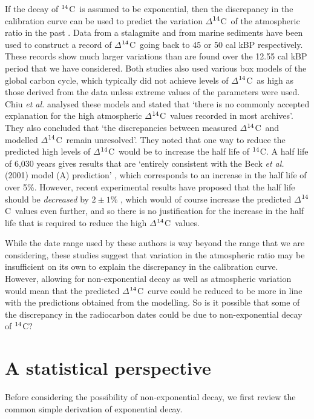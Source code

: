 \documentclass[12pt]{article}
\newcommand{\cft}{$^{\rm 14}$C}
\begin{document}
If the decay of \cft~is assumed to be exponential, then the discrepancy in
the calibration curve can be used to predict the variation $\Delta$\cft~of 
the atmospheric ratio in the past \cite{stuiver98}. Data from 
a stalagmite \cite{beck01} and from marine sediments 
\cite{hughen04} have been used to construct a record of 
$\Delta$\cft~going back to 45 or 50 cal kBP respectively.
These records show much larger variations than are found over the
12.55 cal kBP period that we have considered.
Both studies also used various box models of the global carbon cycle,
which typically did not achieve levels of $\Delta$\cft~as high
as those derived from the data unless extreme values of the parameters were
used. Chiu {\em et al.} \cite{chiu07} analysed these models and
stated that `there is no commonly accepted
explanation for the high atmospheric $\Delta$\cft~values recorded in most
archives'. They also concluded that `the discrepancies between measured
$\Delta$\cft~and modelled $\Delta$\cft~remain unresolved'. They noted that 
one way to reduce the predicted high levels of $\Delta$\cft~would be to 
increase the half life of \cft. A half life of 6,030 years gives results 
that are `entirely consistent with the Beck {\em et al.} (2001) model (A) 
prediction' \cite{chiu07}, which corresponds to an increase in the 
half life of over 5\%. However, recent experimental results have proposed 
that the half life should be {\em decreased} by $2\pm 1$\% \cite{roberts07},
which would of course increase the predicted 
$\Delta$\cft~values even further, and so there is no justification
for the increase in the half life that is required to reduce the high
$\Delta$\cft~values.

While the date range used by these authors is way beyond the range
that we are considering, these studies suggest that variation in the
atmospheric ratio may be insufficient on its own to explain the
discrepancy in the calibration curve. However, allowing for non-exponential
decay as well as atmospheric variation would mean that the predicted
$\Delta$\cft~curve could be reduced to be more in line with the predictions 
obtained from the modelling. So is it possible that some of the discrepancy 
in the radiocarbon dates could be due to non-exponential decay of \cft? 


\section{A statistical perspective}
\label{statistics}

Before considering the possibility of non-exponential decay, we first
review the common simple derivation of exponential decay.
\end{document}
